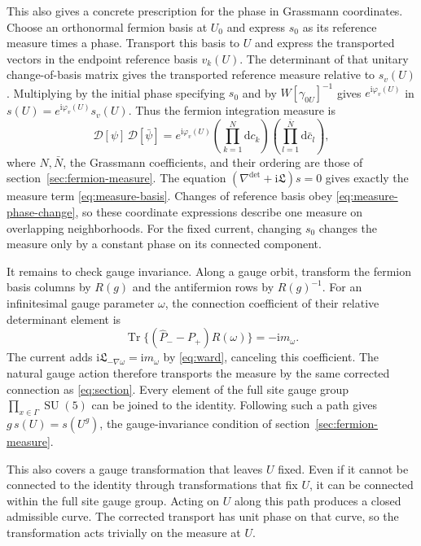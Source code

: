 \documentclass[11pt,a4paper]{article}
\theoremstyle{remark}
\DeclareMathOperator{\Tr}{Tr}
\DeclareMathOperator{\SU}{SU}
\newcommand{\dd}{\mathrm d}
\newcommand{\ii}{\mathrm i}
\begin{document}
This also gives a concrete prescription for the phase in Grassmann
coordinates. Choose an orthonormal fermion basis at $U_0$ and express
$s_0$ as its reference measure times a phase. Transport this basis to
$U$ and express the transported vectors in the endpoint reference basis
$v_k(U)$. The determinant of that unitary change-of-basis matrix gives
the transported reference measure relative to $s_v(U)$. Multiplying
by the initial phase specifying $s_0$ and by $W[\gamma_{0U}]^{-1}$
gives $e^{\ii\varphi_v(U)}$ in
$s(U)=e^{\ii\varphi_v(U)}s_v(U)$. Thus the fermion integration measure is
\begin{equation}
 \boxed{
 \mathcal D[\psi]\,\mathcal D[\bar\psi]
 =e^{\ii\varphi_v(U)}
   \left(\prod_{k=1}^N\dd c_k\right)
   \left(\prod_{l=1}^{\bar N}\dd\bar c_l\right)
 },
 \label{eq:reconstructed-measure}
\end{equation}
where $N,\bar N$, the Grassmann coefficients, and their ordering are
those of section~\ref{sec:fermion-measure}. The equation
$(\nabla^{\det}+\ii\mathfrak L)s=0$ gives exactly the measure term
\eqref{eq:measure-basis}. Changes of reference basis obey
\eqref{eq:measure-phase-change}, so these coordinate expressions describe
one measure on overlapping neighborhoods. For the fixed current,
changing $s_0$ changes the measure only by a constant phase on its
connected component.

It remains to check gauge invariance. Along a gauge orbit, transform
the fermion basis columns by $R(g)$ and the antifermion rows by
$R(g)^{-1}$. For an infinitesimal gauge parameter $\omega$, the
connection coefficient of their relative determinant element is
\begin{equation}
 \Tr\{(\widehat P_--P_+)R(\omega)\}=-\ii m_\omega .
\end{equation}
The current adds $\ii\mathfrak L_{-\nabla\omega}=\ii m_\omega$
by \eqref{eq:ward}, canceling this coefficient. The natural gauge action
therefore transports the measure by the same corrected connection as
\eqref{eq:section}. Every element of the full site gauge group
$\prod_{x\in\Gamma}\SU(5)$ can be joined to the identity. Following
such a path gives $g\,s(U)=s(U^g)$, the gauge-invariance condition of
section~\ref{sec:fermion-measure}.

This also covers a gauge transformation that leaves $U$ fixed. Even if
it cannot be connected to the identity through transformations that fix
$U$, it can be connected within the full site gauge group. Acting on $U$
along this path produces a closed admissible curve. The corrected
transport has unit phase on that curve, so the transformation acts
trivially on the measure at $U$.
\end{document}
